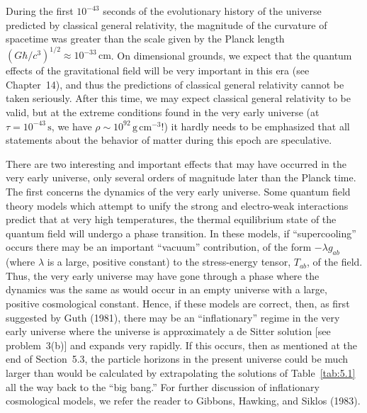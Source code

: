 During the first \(10^{-43}\) seconds of the evolutionary history of the universe
predicted by classical general relativity, the magnitude of the curvature of spacetime
was greater than the scale given by the Planck length
\((G\hbar/c^3)^{1/2}\approx10^{-33}\,\mathrm{cm}\). On dimensional grounds, we
expect that the quantum effects of the gravitational field will be very important in
this era (see Chapter~14), and thus the predictions of classical general relativity
cannot be taken seriously. After this time, we may expect classical general relativity
to be valid, but at the extreme conditions found in the very early universe (at
\(\tau=10^{-43}\,\mathrm{s}\), we have \(\rho\sim10^{92}\,\mathrm{g\,cm^{-3}}\)!) it
hardly needs to be emphasized that all statements about the behavior of matter during
this epoch are speculative.

There are two interesting and important effects that may have occurred in the very
early universe, only several orders of magnitude later than the Planck time. The first
concerns the dynamics of the very early universe. Some quantum field theory models
which attempt to unify the strong and electro-weak interactions predict that at very
high temperatures, the thermal equilibrium state of the quantum field will undergo a
phase transition. In these models, if ``supercooling'' occurs there may be an important
``vacuum'' contribution, of the form \(-\lambda g_{ab}\) (where \(\lambda\) is a large,
positive constant) to the stress-energy tensor, \(T_{ab}\), of the field. Thus, the very
early universe may have gone through a phase where the dynamics was the same as
would occur in an empty universe with a large, positive cosmological constant. Hence,
if these models are correct, then, as first suggested by Guth (1981), there may be an
``inflationary'' regime in the very early universe where the universe is approximately
a de Sitter solution [see problem~3(b)] and expands very rapidly. If this occurs, then
as mentioned at the end of Section~5.3, the particle horizons in the present universe
could be much larger than would be calculated by extrapolating the solutions of
Table~\ref{tab:5.1} all the way back to the ``big bang.'' For further discussion of
inflationary cosmological models, we refer the reader to Gibbons, Hawking, and
Siklos (1983).

